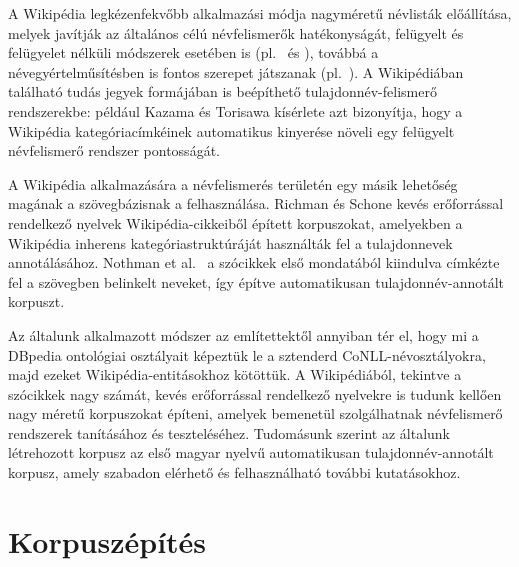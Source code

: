 \documentclass{llncs}
\begin{document}
A Wikipédia legkézenfekvőbb alkalmazási módja nagyméretű névlisták előállítása, melyek javítják az általános célú névfelismerők hatékonyságát, felügyelt és felügyelet nélküli módszerek esetében is (pl.~\cite{Toral:06} és \cite{Nadeau:06}), továbbá a névegyértelműsítésben is fontos szerepet játszanak (pl.~\cite{Bunescu:06}). A Wikipédiában található tudás jegyek formájában is beépíthető tulajdonnév-felismerő rendszerekbe: például Kazama és Torisawa \cite{KaTo07} kísérlete azt bizonyítja, hogy a Wikipédia kategóriacímkéinek automatikus kinyerése növeli egy felügyelt névfelismerő rendszer pontosságát. 

A Wikipédia alkalmazására a névfelismerés területén egy másik lehetőség magának a szövegbázisnak a felhasználása. Richman és Schone \cite{Richman:08} kevés erőforrással rendelkező nyelvek Wikipédia-cikkeiből épített korpuszokat, amelyekben a Wikipédia inherens kategóriastruktúráját használták fel a tulajdonnevek annotálásához. Nothman et al.~\cite{Nothman:08} a szócikkek első mondatából kiindulva címkézte fel a szövegben belinkelt neveket, így építve automatikusan tulajdonnév-annotált korpuszt. 

Az általunk alkalmazott módszer az említettektől annyiban tér el, hogy mi a DBpedia ontológiai osztályait képeztük le a sztenderd CoNLL-névosztályokra, majd ezeket Wikipédia-entitásokhoz kötöttük. 
A Wikipédiából, tekintve a szócikkek nagy számát, kevés erőforrással rendelkező nyelvekre is tudunk kellően nagy méretű korpuszokat építeni, amelyek bemenetül szolgálhatnak névfelismerő rendszerek tanításához és teszteléséhez. Tudomásunk szerint az általunk létrehozott korpusz az első magyar nyelvű automatikusan tulajdonnév-annotált korpusz, amely szabadon elérhető és felhasználható további kutatásokhoz. 

\section{Korpuszépítés}
\label{corpusbuilding}

\end{document}
